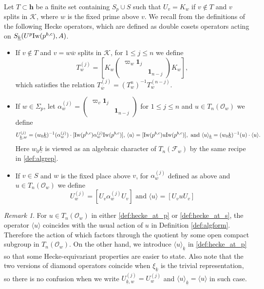 \documentclass[leqno]{amsart}
\theoremstyle{definition}
\theoremstyle{remark}
\newtheorem{rem}[thm]{Remark}
\newcommand{\smat}[1]{\left(\begin{smallmatrix} #1 \end{smallmatrix}\right)}
\newcommand{\id}{\mathbf{1}}
\newcommand{\oo}{\mathcal{O}}
\newcommand{\finite}{\mathbf{h}}
\newcommand{\F}{{\mathcal{F}}} %
\newcommand{\K}{{\mathcal{K}}} %
\newcommand{\bw}{{\overline{w}}}
\newcommand{\wt}[1]{\underline{ #1 }}
\newcommand{\Iw}{\textnormal{Iw}} %
\begin{document}
Let $T\subset\finite$ be a finite set containing $S_p\cup S$
such that $U_v=K_w$ if $v\notin T$ and $v$ splits in $\K$,
where $w$ is the fixed prime above $v$.
We recall from \cite{ger} 
the definitions of the following Hecke operators,
which are defined as double cosets operators
acting on $S_{\wt{k}}(U^p\Iw(p^{b,c}),A)$.
\begin{itemize}

\item 
If $v\notin T$ and $v=w\bw$ splits in $\K$,
for $1\leq j\leq n$ we define 
\begin{equation}\label{def:hecke_away_p}
	T_w^{(j)}=
	\left[
	K_w
	\begin{pmatrix}
		\varpi_w\id_{j}&\\&\id_{n-j}
	\end{pmatrix}
	K_w
	\right],
\end{equation}
which satisfies the relation
$T_{\bw}^{(j)}=(T_{w}^{{n}})^{-1}T_w^{(n-j)}$.

\item
If $w\in \Sigma_p$, let  
$\alpha_w^{(j)}=
\smat{ \varpi_v\id_{j}&\\&\id_{n-j} } $
for $1\leq j\leq n$
and $u\in T_n(\oo_w)$ we define
\begin{equation}\label{def:hecke_at_p}
	U_{\wt{k},w}^{(j)}=
	(w_0\wt{k})^{-1}(\alpha_{w}^{(j)})\cdot
	[\Iw(p^{b,c})\alpha_w^{(j)}\Iw(p^{b,c})],\,
	\langle u\rangle=
	[\Iw(p^{b,c})u\Iw(p^{b,c})],
	\text{ and }
	\langle u\rangle_{\wt{k}}= (w_0\wt{k})^{-1}(u)\cdot \langle u\rangle.
\end{equation}
Here $w_0\wt{k}$ is viewed as an algebraic character of $T_n(\F_w)$ 
by the same recipe in \eqref{def:algrep}.

\item 
If $v\in S$ and $w$ is the fixed place above $v$,
for $\alpha_w^{(j)}$ defined as above
and $u\in T_n(\oo_w)$ we define 
\begin{equation}\label{def:hecke_at_s}
	U_{w}^{(j)}=
	[U_v\alpha_w^{(j)}U_v]
	\text{ and }
	\langle u\rangle= 
	[U_vu U_v]
\end{equation}

\end{itemize}

\begin{rem}
For $u\in T_n(\oo_w)$ in either 
\eqref{def:hecke_at_p} or \eqref{def:hecke_at_s},
the operator $\langle u\rangle$
coincides with the usual action of $u$ in
Definition \ref{def:algform}.
Therefore the action of which
factors through the quotient by some 
open compact subgroup in $T_n(\oo_w)$.
On the other hand, 
we introduce $\langle u\rangle_{\wt{k}}$
in \eqref{def:hecke_at_p}
so that some Hecke-equivariant properties
are easier to state.
Also note that the two versions of diamond operators
coincide when $\xi_{\wt{k}}$ is the trivial representation,
so there is no confusion when we write
$U_{\wt{k},w}^{(j)}=U_{w}^{(j)}$ and 
$\langle u\rangle_{\wt{k}}=\langle u\rangle$ in such case.
\end{rem}
\end{document}
